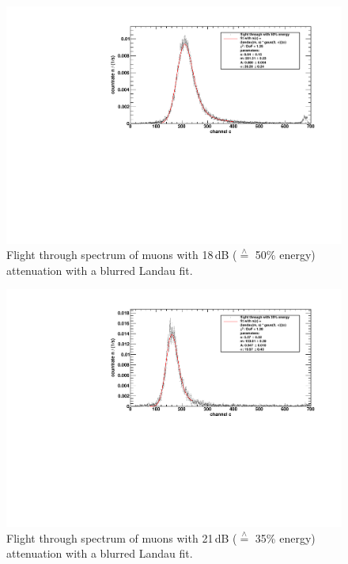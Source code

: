 \begin{figure}[H]
\begin{center}
  \includegraphics[width=\textwidth]{../img/energiekalibration_50.pdf}
  \caption{Flight through spectrum of muons with 18\,dB ($\overset{\wedge}{=}$ 50\% energy) attenuation with a blurred Landau fit.}
  \label{img:ecal:50}
\end{center}
\end{figure}

\begin{figure}[H]
\begin{center}
  \includegraphics[width=\textwidth]{../img/energiekalibration_35.pdf}
  \caption{Flight through spectrum of muons with 21\,dB ($\overset{\wedge}{=}$ 35\% energy) attenuation with a blurred Landau fit.}
  \label{img:ecal:35}
\end{center}
\end{figure}

